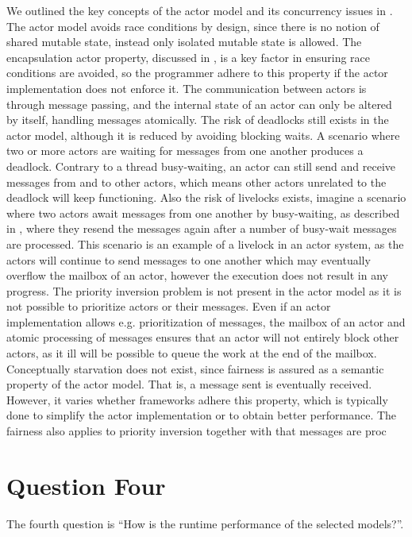 We outlined the key concepts of the actor model and its concurrency issues in . The actor model avoids race conditions by design, since there is no notion of shared mutable state, instead only isolated mutable state is allowed. The encapsulation actor property, discussed in , is a key factor in ensuring race conditions are avoided, so the programmer adhere to this property if the actor implementation does not enforce it. The communication between actors is through message passing, and the internal state of an actor can only be altered by itself, handling messages atomically. The risk of deadlocks still exists in the actor model, although it is reduced by avoiding blocking waits. A scenario where two or more actors are waiting for messages from one another produces a deadlock. Contrary to a thread busy-waiting, an actor can still send and receive messages from and to other actors, which means other actors unrelated to the deadlock will keep functioning. Also the risk of livelocks exists, imagine a scenario where two actors await messages from one another by busy-waiting, as described in , where they resend the messages again after a number of busy-wait messages are processed. This scenario is an example of a livelock in an actor system, as the actors will continue to send messages to one another which may eventually overflow the mailbox of an actor, however the execution does not result in any progress. The priority inversion problem is not present in the actor model as it is not possible to prioritize actors or their messages. Even if an actor implementation allows e.g. prioritization of messages, the mailbox of an actor and atomic processing of messages ensures that an actor will not entirely block other actors, as it ill will be possible to queue the work at the end of the mailbox. Conceptually starvation does not exist, since fairness is assured as a semantic property of the actor model. That is, a message sent is eventually received. However, it varies whether frameworks adhere this property, which is typically done to simplify the actor implementation or to obtain better performance. The fairness also applies to priority inversion together with that messages are proc
\section{Question Four}
The fourth question is ``How is the runtime performance of the selected models?''.

